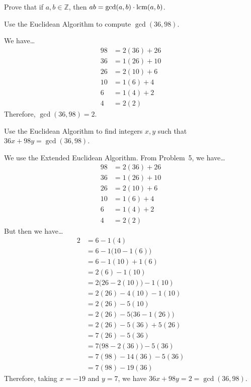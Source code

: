 \documentclass[11pt,letterpaper]{article}
\begin{document}
 Prove that if $a, b \in \mathbb{Z}$, then $ab= \gcd(a, b) \cdot \operatorname{lcm}(a, b)$. \pspace





\newpage





 Use the Euclidean Algorithm to compute $\gcd(36, 98)$. \pspace

\sol We have\dots
	\[
	\begin{aligned}
	98&= 2(36) + 26 \\
	36&= 1(26) + 10 \\
	26&= 2(10) + 6 \\
	10&= 1(6) + 4 \\
	6&= 1(4) + 2 \\
	4&= 2(2)
	\end{aligned}
	\]
Therefore, $\gcd(36, 98)= 2$. 



\newpage



 Use the Euclidean Algorithm to find integers $x, y$ such that $36x + 98y= \gcd(36, 98)$. \pspace

\sol We use the Extended Euclidean Algorithm. From Problem~5, we have\dots
	\[
	\begin{aligned}
	98&= 2(36) + 26 \\
	36&= 1(26) + 10 \\
	26&= 2(10) + 6 \\
	10&= 1(6) + 4 \\
	6&= 1(4) + 2 \\
	4&= 2(2)
	\end{aligned}
	\]
But then we have\dots
	\[
	\begin{aligned}
	2&= 6 - 1(4) \\
	&= 6 - 1 \big(10 - 1(6) \big) \\
	&= 6 - 1(10) + 1(6) \\
	&= 2(6) - 1(10) \\
	&= 2 \big(26 - 2(10) \big) - 1(10) \\
	&= 2(26) - 4(10) - 1(10) \\
	&= 2(26) - 5(10) \\
	&= 2(26) - 5 \big(36 - 1(26) \big) \\
	&= 2(26) - 5(36) + 5(26) \\
	&= 7(26) - 5(36) \\
	&= 7 \big(98 - 2(36) \big) - 5(36) \\
	&= 7(98) - 14(36) - 5(36) \\
	&= 7(98) - 19(36)
	\end{aligned}
	\]
Therefore, taking $x= -19$ and $y= 7$, we have $36x + 98y= 2= \gcd(36, 98)$. 
\end{document}

